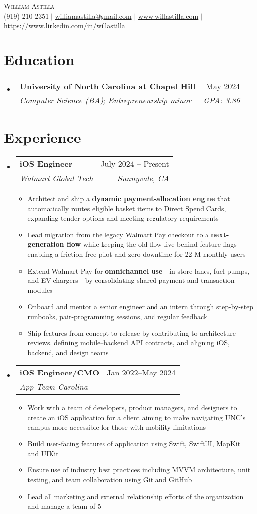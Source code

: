 \documentclass[letterpaper,11pt]{article}
\makeatletter
\newcommand{\resumeItem}[1]{
  \item\small{{#1}}
}
\newcommand{\resumeExperience}[4]{
  \vspace{-2pt}\item
    \begin{tabular*}{0.97\textwidth}[t]{l@{\extracolsep{\fill}}r}
      \textbf{#1} & #2 \\
      \textit{#3} & \textit{#4} \\
    \end{tabular*}
}
\newcommand{\resumeSubheading}[4]{
  \vspace{-2pt}\item
    \begin{tabular*}{0.97\textwidth}[t]{l@{\extracolsep{\fill}}r}
      \textbf{#1} & #2 \\
      \textit{\small#3} & \textit{\small #4} \\
    \end{tabular*}\vspace{-7pt}
}
\newcommand{\resumeSubHeadingListStart}{\begin{itemize}[leftmargin=0.15in, label={}]}
\newcommand{\resumeSubHeadingListEnd}{\end{itemize}}
\newcommand{\resumeItemListStart}{\begin{itemize}}
\newcommand{\resumeItemListEnd}{\end{itemize}\vspace{-5pt}}
\makeatother
\begin{document}
\begin{center}
    {\Huge \scshape William Astilla} \\ \vspace{2pt}
    \small
    (919) 210-2351 $|$ \href{mailto:williamastilla@gmail.com}{williamastilla@gmail.com} $|$ \href{https://www.willastilla.com}{www.willastilla.com} $|$ \href{https://www.linkedin.com/in/willastilla}{https://www.linkedin.com/in/willastilla}
\end{center}

\section{Education}
  \resumeSubHeadingListStart
    \resumeSubheading
      {University of North Carolina at Chapel Hill}{May 2024}
      {Computer Science (BA); Entrepreneurship minor}{\textit{GPA: 3.86}}
  \resumeSubHeadingListEnd

\section{Experience}
  \resumeSubHeadingListStart
  \resumeExperience
    {iOS Engineer}{July 2024 -- Present}{Walmart Global Tech}{Sunnyvale, CA}
    \resumeItemListStart
      \resumeItem{Architect and ship a \textbf{dynamic payment-allocation engine} that automatically routes eligible basket items to Direct Spend Cards, expanding tender options and meeting regulatory requirements}
      \resumeItem{Lead migration from the legacy Walmart Pay checkout to a \textbf{next-generation flow} while keeping the old flow live behind feature flags—enabling a friction-free pilot and zero downtime for 22 M monthly users}
      \resumeItem{Extend Walmart Pay for \textbf{omnichannel use}—in-store lanes, fuel pumps, and EV chargers—by consolidating shared payment and transaction modules}
      \resumeItem{Onboard and mentor a senior engineer and an intern through step-by-step runbooks, pair-programming sessions, and regular feedback}
      \resumeItem{Ship features from concept to release by contributing to architecture reviews, defining mobile–backend API contracts, and aligning iOS, backend, and design teams}
    \resumeItemListEnd
    \resumeExperience
      {iOS Engineer/CMO}{Jan 2022--May 2024}{App Team Carolina}{ }
      \resumeItemListStart
        \resumeItem{Work with a team of developers, product managers, and designers to create an iOS application for a client aiming to make navigating UNC's campus more accessible for those with mobility limitations}
        \resumeItem{Build user-facing features of application using Swift, SwiftUI, MapKit and UIKit}
        \resumeItem{Ensure use of industry best practices including MVVM architecture, unit testing, and team collaboration using Git and GitHub}
        \resumeItem{Lead all marketing and external relationship efforts of the organization and manage a team of 5}
      \resumeItemListEnd
  \resumeSubHeadingListEnd
\end{document}
